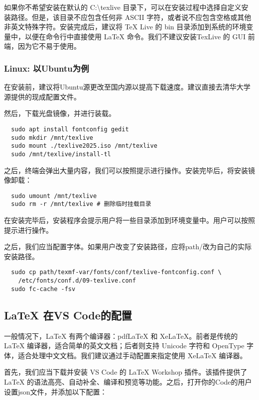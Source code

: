 \documentclass[../main.tex]{subfiles}
\begin{document}
如果你不希望安装在默认的 C:\textbackslash texlive 目录下，可以在安装过程中选择自定义安装路径。但是，该目录不应包含任何非 ASCII 字符，或者说不应包含空格或其他非英文特殊字符。安装完成后，建议将 TeX Live 的 bin 目录添加到系统的环境变量中，以便在命令行中直接使用 LaTeX 命令。我们不建议安装TexLive 的 GUI 前端，因为它不易于使用。

\subsubsection{Linux: 以Ubuntu为例}

在安装前，建议将Ubuntu源更改至国内源以提高下载速度。建议直接去清华大学源提供的现成配置文件。

然后，下载光盘镜像，并进行装载。

\begin{verbatim}
  sudo apt install fontconfig gedit 
  sudo mkdir /mnt/texlive 
  sudo mount ./texlive2025.iso /mnt/texlive 
  sudo /mnt/texlive/install-tl
\end{verbatim}

之后，终端会弹出大量内容，我们可以按照提示进行操作。安装完毕后，将安装镜像卸载：

\begin{verbatim}
  sudo umount /mnt/texlive
  sudo rm -r /mnt/texlive # 删除临时挂载目录
\end{verbatim}

在安装完毕后，安装程序会提示用户将一些目录添加到环境变量中。用户可以按照提示进行操作。

之后，我们应当配置字体。如果用户改变了安装路径，应将path/改为自己的实际安装路径。

\begin{verbatim}
  sudo cp path/texmf-var/fonts/conf/texlive-fontconfig.conf \
    /etc/fonts/conf.d/09-texlive.conf
  sudo fc-cache -fsv
\end{verbatim}

\subsection{LaTeX 在VS Code的配置}

一般情况下，LaTeX 有两个编译器：pdfLaTeX 和 XeLaTeX。前者是传统的 LaTeX 编译器，适合简单的英文文档；后者则支持 Unicode 字符和 OpenType 字体，适合处理中文文档。我们建议通过手动配置来指定使用 XeLaTeX 编译器。

首先，我们应当下载并安装 VS Code 的 LaTeX Workshop 插件。该插件提供了 LaTeX 的语法高亮、自动补全、编译和预览等功能。之后，打开你的Code的用户设置json文件，并添加以下配置：
\end{document}
